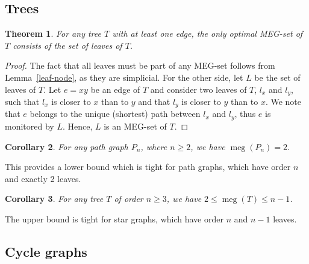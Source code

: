 \documentclass[10pt,a4paper]{article}
\newtheorem{theorem}{Theorem}[section]
\newtheorem{corollary}[theorem]{Corollary}
\DeclareMathOperator{\MEG}{meg}
\begin{document}
\subsection{Trees}

\begin{theorem}\label{tt}\label{thm:trees}
For any tree $T$ with at least one edge, the only optimal MEG-set of $T$ consists of the set of leaves of $T$.
\end{theorem}
\begin{proof} The fact that all leaves must be part of any MEG-set follows from Lemma~\ref{leaf-node}, as they are simplicial. For the other side, let $L$ be the set of leaves of $T$. Let $e = xy$ be an edge of $T$ and consider two leaves of $T$, $l_x$ and $l_y$, such that $l_x$ is closer to $x$ than to $y$ and that $l_y$ is closer to $y$ than to $x$. We note that $e$ belongs to the unique (shortest) path between $l_x$ and $l_y$, thus $e$ is monitored by $L$. Hence, $L$ is an MEG-set of $T$. 
\end{proof}

\begin{corollary}
For any path graph $P_n$, where $n\geq2$, we have $\MEG(P_n) = 2$.
\end{corollary}
This provides a lower bound which is tight for path graphs, which have order $n$ and exactly 2 leaves. 

  
\begin{corollary}
For any tree $T$ of order $n\geq 3$, we have $2 \leq\MEG(T)\leq n-1$.
\end{corollary}

The upper bound is tight for star graphs, which have order $n$ and $n-1$ leaves.


\subsection{Cycle graphs}
\end{document}
